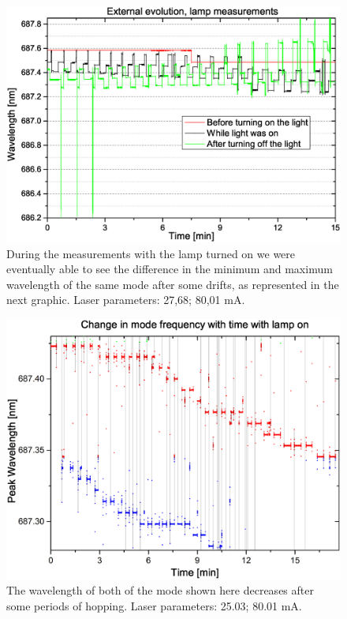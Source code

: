 \begin{figure}[!t]\centering
\includegraphics[width=\linewidth, draft=\foto]{eps/lampandnot.eps}
\caption{During the measurements with the lamp turned on we were  eventually able to see the difference in the minimum and maximum wavelength of the same mode after some drifts, as represented in the next graphic. Laser parameters: 27,68\cel; 80,01  mA.}
\label{lampdrift}
\end{figure}

\begin{figure}[!b]\centering
\includegraphics[width=\linewidth, draft=\foto]{eps/modedrift.eps}
\caption{The wavelength of both of the mode shown here decreases after some periods of hopping. Laser parameters: 25.03\cel; 80.01 mA.}
\label{modedrift}
\end{figure}
 
